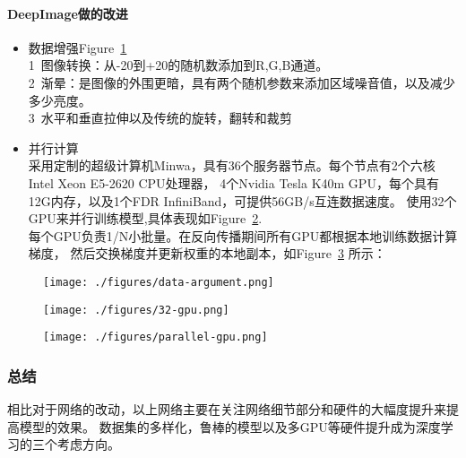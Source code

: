 \documentclass{article}
\begin{document}
\begin{CJK}{UTF8}{gbsn}
\begin{itemize}
\end{itemize}





\paragraph{DeepImage做的改进}
\begin{itemize}
\item 数据增强Figure~\ref{fig:data-argument}\\
1\ 图像转换：从-20到+20的随机数添加到R,G,B通道。\\
2\ 渐晕：是图像的外围更暗，具有两个随机参数来添加区域噪音值，以及减少多少亮度。\\
3\ 水平和垂直拉伸以及传统的旋转，翻转和裁剪\\
\item 并行计算\\
采用定制的超级计算机Minwa，具有36个服务器节点。每个节点有2个六核Intel Xeon E5-2620 CPU处理器，
4个Nvidia Tesla K40m GPU，每个具有12G内存，以及1个FDR InfiniBand，可提供56GB/s互连数据速度。
使用32个GPU来并行训练模型,具体表现如Figure~\ref{fig:32-gpu}.\\
每个GPU负责1/N小批量。在反向传播期间所有GPU都根据本地训练数据计算梯度，
然后交换梯度并更新权重的本地副本，如Figure~\ref{fig:parallel-gpu} 所示：
\end{itemize}

\begin{figure}[!h]
    \centering
    \texttt{[image: ./figures/data-argument.png]}
    \caption{}
    \label{fig:data-argument}
\end{figure}



\begin{figure}[!h]
    \centering
    \texttt{[image: ./figures/32-gpu.png]}
    \caption{}
    \label{fig:32-gpu}
\end{figure}


\begin{figure}[!h]
    \centering
    \texttt{[image: ./figures/parallel-gpu.png]}
    \caption{}
    \label{fig:parallel-gpu}
\end{figure}


\subsubsection{总结}
    相比对于网络的改动，以上网络主要在关注网络细节部分和硬件的大幅度提升来提高模型的效果。
    数据集的多样化，鲁棒的模型以及多GPU等硬件提升成为深度学习的三个考虑方向。



\end{CJK}
\end{document}
